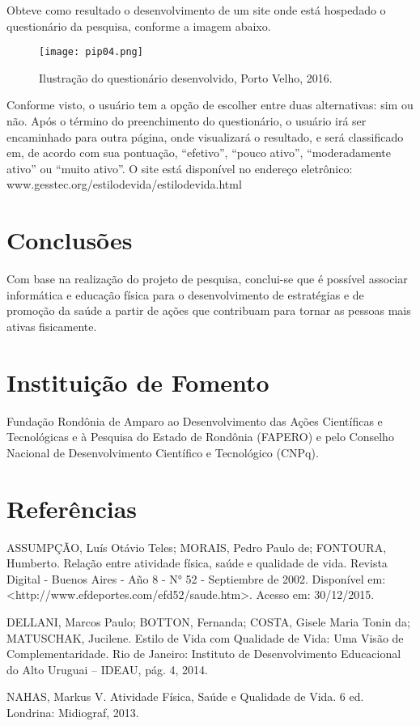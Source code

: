 \documentclass[article,12pt,onesidea,4paper,english,brazil,]{abntex2}
\begin{document}
	Obteve como resultado o desenvolvimento de um site onde está hospedado o questionário da pesquisa, conforme a imagem abaixo.
	
	\begin{figure}[h]
		\centering
		\texttt{[image: pip04.png]}
		\caption{Ilustração do questionário desenvolvido, Porto Velho, 2016.}
	\end{figure}
Conforme visto, o usuário tem a opção de escolher entre duas alternativas: sim ou não. Após o término do preenchimento do questionário, o usuário irá ser encaminhado para outra página, onde visualizará o resultado, e será classificado em, de acordo com sua pontuação, “efetivo”, “pouco ativo”, “moderadamente ativo” ou “muito ativo”.
O site está disponível no endereço eletrônico: www.gesstec.org/estilodevida/estilodevida.html
	
	\section*{Conclusões}
	
	Com base na realização do projeto de pesquisa, conclui-se que é possível associar informática e educação física para o desenvolvimento de estratégias e de promoção da saúde a partir de ações que contribuam para tornar as pessoas mais ativas fisicamente.
	
	\section*{Instituição de Fomento}
	
	Fundação Rondônia de Amparo ao Desenvolvimento das Ações Científicas e Tecnológicas e à Pesquisa do Estado de Rondônia (FAPERO) e pelo Conselho Nacional de Desenvolvimento Científico e Tecnológico (CNPq).
	
	\sloppy
	\section*{Referências}
	
	\noindent ASSUMPÇÃO, Luís Otávio Teles; MORAIS, Pedro Paulo de; FONTOURA, Humberto. Relação entre atividade física, saúde e qualidade de vida. Revista Digital - Buenos Aires - Año 8 - N° 52 - Septiembre de 2002. Disponível em:
	<http://www.efdeportes.com/efd52/saude.htm>. Acesso em: 30/12/2015.
	
	\noindent DELLANI, Marcos Paulo; BOTTON, Fernanda; COSTA, Gisele Maria Tonin da; MATUSCHAK, Jucilene. Estilo de Vida com Qualidade de Vida: Uma Visão de Complementaridade. Rio de Janeiro: Instituto de Desenvolvimento Educacional do Alto Uruguai – IDEAU, pág. 4, 2014.
	
	\noindent NAHAS, Markus V. Atividade Física, Saúde e Qualidade de Vida. 6 ed. Londrina: Midiograf, 2013.
	
	
\end{document}
